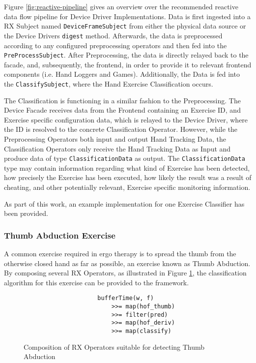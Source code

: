 Figure \ref{fig:reactive-pipeline} gives an overview over the recommended reactive data flow pipeline for Device Driver Implementations. Data is first ingested into a \gls{RX} Subject named \texttt{DeviceFrameSubject} from either the physical data source or the Device Drivers \texttt{digest} method. Afterwards, the data is preprocessed according to any configured preprocessing operators and then fed into the \texttt{PreProcessSubject}. After Preprocessing, the data is directly relayed back to the facade, and, subsequently, the frontend, in order to provide it to relevant frontend components (i.e. Hand Loggers and Games). Additionally, the Data is fed into the \texttt{ClassifySubject}, where the Hand Exercise Classification occurs.

The Classification is functioning in a similar fashion to the Preprocessing. The Device Facade receives data from the Frontend containing an Exercise ID, and Exercise specific configuration data, which is relayed to the Device Driver, where the ID is resolved to the concrete Classification Operator. However, while the Preprocessing Operators both input and output Hand Tracking Data, the Classification Operators only receive the Hand Tracking Data as Input and produce data of type \texttt{ClassificationData} as output. The \texttt{ClassificationData} type may contain information regarding what kind of Exercise has been detected, how precisely the Exercise has been executed, how likely the result was a result of cheating, and other potentially relevant, Exercise specific monitoring information. 

As part of this work, an example implementation for one Exercise Classifier has been provided.

\subsubsection{Thumb Abduction Exercise}
A common exercise required in ergo therapy is to spread the thumb from the otherwise closed hand as far as possible, an exercise known as Thumb Abduction\cite[sec. 4.1.5, par. Abduction]{StudiArbeitVolzBaumotte}. By composing several \gls{RX} Operators, as illustrated in Figure \ref{fig:rx-composition}, the classification algorithm for this exercise can be provided to the framework.

\begin{figure}
\begin{verbatim}
                     bufferTime(w, f) 
                         >>= map(hof_thumb)
                         >>= filter(pred) 
                         >>= map(hof_deriv) 
                         >>= map(classify)
\end{verbatim}
\caption{Composition of \gls{RX} Operators suitable for detecting Thumb Abduction}
\label{fig:rx-composition}
\end{figure}

